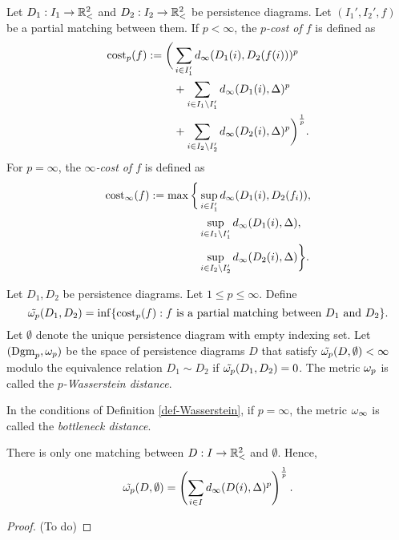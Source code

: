 \begin{definition}
    Let $ D_1: I_1 \to \mathbb{R}_<^2 $ and $ D_2: I_2 \to \mathbb{R}_<^2 $ be persistence diagrams. Let $ (I_1', I_2', f) $ be a partial matching between them. If $ p < \infty $, the {\it $p$-cost of $ f $} is defined as
    \begin{align*}
        \operatorname{cost}_p(f) := \bigg(&\sum_{i \in I_1'} d_\infty(D_1(i), D_2(f(i)))^p \\
        &+ \sum_{i \in I_1 \setminus I_1'} d_\infty(D_1(i), \Delta)^p \\
        &+ \sum_{i \in I_2 \setminus I_2'} d_\infty(D_2(i), \Delta)^p \bigg)^{\frac{1}{p}}.
    \end{align*}
    For $ p = \infty $, the {\it $\infty$-cost of $ f $} is defined as
    \begin{align*}
        \operatorname{cost}_\infty(f) := \max \bigg\{&\sup_{i \in I_1'} d_\infty(D_1(i), D_2(f_i)), \\
        &\sup_{i\in I_1 \setminus I_1'} d_\infty(D_1(i), \Delta), \\
        &\sup_{i\in I_2 \setminus I_2'} d_\infty(D_2(i), \Delta)\bigg\}.
    \end{align*}
\end{definition}

\begin{definition} \label{def-Wasserstein}
    Let $ D_1, D_2 $ be persistence diagrams. Let $ 1 \leq p \leq \infty $. Define
    $$
        \tilde {\omega_p} (D_1, D_2) = \inf \{\operatorname{cost}_p(f) : f \text{ is a partial matching between } D_1 \text{ and } D_2 \}.
    $$
    Let $ \emptyset $ denote the unique persistence diagram with empty indexing set. Let $ (\operatorname{Dgm}_p, \omega_p) $ be the space of persistence diagrams $ D $ that satisfy $ \tilde {\omega_p}(D, \emptyset) < \infty $ modulo the equivalence relation $ D_1 \sim D_2 $ if $ \tilde {\omega_p} (D_1, D_2) = 0 $. The metric $ \omega_p $ is called the {\it $p$-Wasserstein distance}.
\end{definition}

\begin{definition}
    In the conditions of Definition \ref{def-Wasserstein}, if $ p = \infty $, the metric $ \omega_\infty $ is called the {\it bottleneck distance}.
\end{definition}

\begin{proposition} \label{prop-empty-mathing-distance}
    There is only one matching between $ D: I \to \mathbb{R}_<^2 $ and $ \emptyset $. Hence,
    $$
        \tilde {\omega_p}(D, \emptyset) = \left(\sum_{i\in I} d_\infty(D(i), \Delta)^p\right)^{\frac{1}{p}}.
    $$
\end{proposition}
\begin{proof}
    (To do)
\end{proof}

